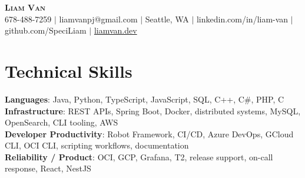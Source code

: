 \documentclass[letterpaper,11pt]{article}
\begin{document}

%
\begin{center}
    \textbf{\Huge \scshape Liam Van} \\ \vspace{1pt}
    \small 678-488-7259 $|$ \small {liamvanpj@gmail.com} $|$ Seattle, WA
 {{$|$ linkedin.com/in/liam-van} {$|$ github.com/SpeciLiam} {$|$ \href{https://liamvan.dev}{liamvan.dev}}}

\end{center}

\section{Technical Skills}
 \begin{itemize}[leftmargin=0.15in, label={}]
    \small{\item{
     \textbf{Languages}{: Java, Python, TypeScript, JavaScript, SQL, C++, C\#, PHP, C} \\
     \textbf{Infrastructure}{: REST APIs, Spring Boot, Docker, distributed systems, MySQL, OpenSearch, CLI tooling, AWS} \\
     \textbf{Developer Productivity}{: Robot Framework, CI/CD, Azure DevOps, GCloud CLI, OCI CLI, scripting workflows, documentation} \\
     \textbf{Reliability / Product}{: OCI, GCP, Grafana, T2, release support, on-call response, React, NestJS} \\
    }}
 \end{itemize}
%

\end{document}
